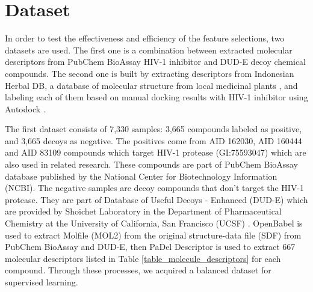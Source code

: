 \documentclass[conference]{IEEEtran}
\begin{document}
\section{Dataset} \label{Dataset}

In order to test the effectiveness and efficiency of the feature selections, two datasets are used. The first one is a combination between extracted molecular descriptors from PubChem BioAssay HIV-1 inhibitor \cite{bioassay2014update} and DUD-E decoy chemical compounds\cite{mysinger2012directory}. The second one is built by extracting descriptors from Indonesian Herbal DB, a database of molecular structure from local medicinal plants \cite{yanuar2011medicinal}, and labeling each of them based on manual docking results with HIV-1 inhibitor using Autodock \cite{morris2009autodock4}.  

The first dataset consists of 7,330 samples: 3,665 compounds labeled as positive, and 3,665 decoys as negative. The positives come from AID 162030, AID 160444 and AID 83109 compounds which target HIV-1 protease (GI:75593047) which are also used in related research\cite{yanuar2014virtual}. These compounds are part of PubChem BioAssay database published by the National Center for Biotechnology Information (NCBI). The negative samples are decoy compounds that don't target the HIV-1 protease. They are part of Database of Useful Decoys - Enhanced (DUD-E) which are provided by Shoichet Laboratory in the Department of Pharmaceutical Chemistry at the University of California, San Francisco (UCSF) \cite{mysinger2012directory}. OpenBabel\cite{o2011open} is used to extract Molfile (MOL2) from the original structure-data file (SDF) from PubChem BioAssay and DUD-E, then PaDel Descriptor\cite{yap2011padel} is used to extract 667 molecular descriptors listed in Table \ref{table_molecule_descriptors} for each compound. Through these processes, we acquired a balanced dataset for supervised learning.
\end{document}
